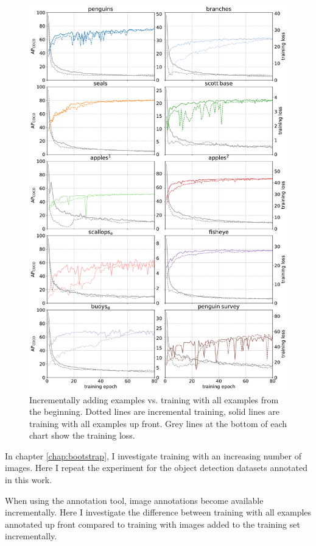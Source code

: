 \begin{figure}[!p]
  \centering
  \includegraphics[width=0.9\linewidth]{charts/training/incremental.pdf}
  \caption{Incrementally adding examples vs. training with all examples from the beginning. Dotted lines are incremental training, solid lines are training with all examples up front. Grey lines at the bottom of each chart show the training loss.}  
  \label{fig:incremental}
\end{figure}

In chapter \ref{chap:bootstrap}, I investigate training with an increasing number of images. Here I repeat the experiment for the object detection datasets annotated in this work.

When using the annotation tool, image annotations become available incrementally. Here I investigate the difference between training with all examples annotated up front compared to training with images added to the training set incrementally. 

